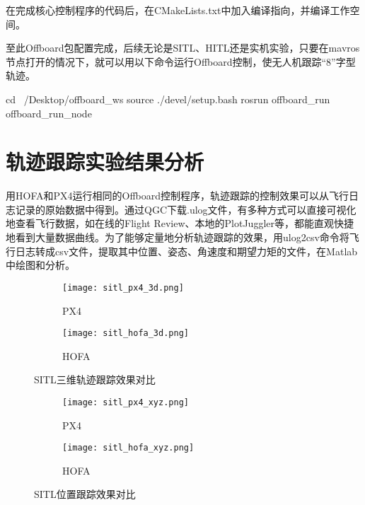 在完成核心控制程序的代码后，在CMakeLists.txt中加入编译指向，并编译工作空间。
至此Offboard包配置完成，后续无论是SITL、HITL还是实机实验，只要在mavros节点打开的情况下，就可以用以下命令运行Offboard控制，使无人机跟踪“8”字型轨迹。
\begin{codeblock}[language=C]
  cd ~/Desktop/offboard_ws
  source ./devel/setup.bash
  rosrun offboard_run offboard_run_node
\end{codeblock}


\section{轨迹跟踪实验结果分析}
用HOFA和PX4运行相同的Offboard控制程序，轨迹跟踪的控制效果可以从飞行日志记录的原始数据中得到。通过QGC下载.ulog文件，有多种方式可以直接可视化地查看飞行数据，如在线的Flight Review、本地的PlotJuggler等，都能直观快捷地看到大量数据曲线。为了能够定量地分析轨迹跟踪的效果，用ulog2csv命令将飞行日志转成csv文件，提取其中位置、姿态、角速度和期望力矩的文件，在Matlab中绘图和分析。

\begin{figure}[H]
  \centering
  \begin{subfigure}[b]{0.49\linewidth}
      \texttt{[image: sitl\_px4\_3d.png]}
      \caption{PX4}
  \end{subfigure}
  \hfill %
  \begin{subfigure}[b]{0.49\linewidth}
      \texttt{[image: sitl\_hofa\_3d.png]}
      \caption{HOFA}
  \end{subfigure}
  \caption{SITL三维轨迹跟踪效果对比}
  \label{SITL三维轨迹跟踪效果对比}
\end{figure}
  \begin{figure}[H]
    \centering
  \begin{subfigure}[b]{0.49\linewidth}
      \texttt{[image: sitl\_px4\_xyz.png]}
      \caption{PX4}
  \end{subfigure}
  \hfill
  \begin{subfigure}[b]{0.49\linewidth}
      \texttt{[image: sitl\_hofa\_xyz.png]}
      \caption{HOFA}
  \end{subfigure}
  \caption{SITL位置跟踪效果对比}
  \label{SITL位置跟踪效果对比}
\end{figure}

